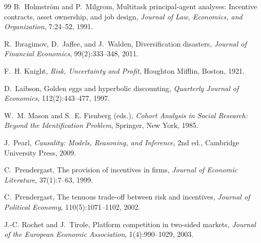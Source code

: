 \begin{thebibliography}{99}
B.~Holmstr\"om and P.~Milgrom,
\newblock Multitask principal-agent analyses: Incentive contracts, asset ownership, and job design,
\newblock \emph{Journal of Law, Economics, and Organization}, 7:24--52, 1991.

R.~Ibragimov, D.~Jaffee, and J.~Walden,
\newblock Diversification disasters,
\newblock \emph{Journal of Financial Economics}, 99(2):333--348, 2011.

F.~H. Knight,
\newblock \emph{Risk, Uncertainty and Profit},
\newblock Houghton Mifflin, Boston, 1921.

D.~Laibson,
\newblock Golden eggs and hyperbolic discounting,
\newblock \emph{Quarterly Journal of Economics}, 112(2):443--477, 1997.

W.~M. Mason and S.~E. Fienberg (eds.),
\newblock \emph{Cohort Analysis in Social Research: Beyond the Identification Problem},
\newblock Springer, New York, 1985.

J.~Pearl,
\newblock \emph{Causality: Models, Reasoning, and Inference}, 2nd ed.,
\newblock Cambridge University Press, 2009.

C.~Prendergast,
\newblock The provision of incentives in firms,
\newblock \emph{Journal of Economic Literature}, 37(1):7--63, 1999.

C.~Prendergast,
\newblock The tenuous trade-off between risk and incentives,
\newblock \emph{Journal of Political Economy}, 110(5):1071--1102, 2002.

J.-C. Rochet and J.~Tirole,
\newblock Platform competition in two-sided markets,
\newblock \emph{Journal of the European Economic Association}, 1(4):990--1029, 2003.


\end{thebibliography}
